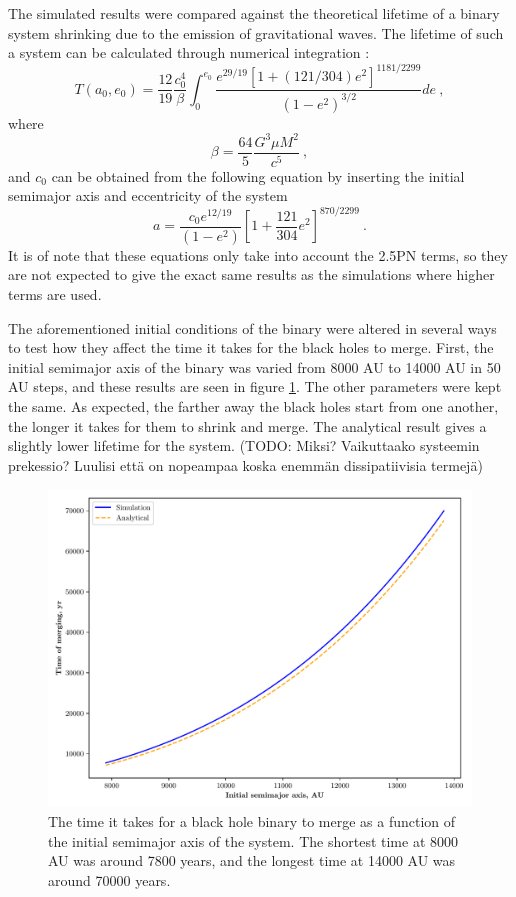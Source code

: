 \documentclass[english, oneside]{HYgradu}
\begin{document}
The simulated results were compared against the theoretical lifetime of a binary system shrinking due to the emission of gravitational waves. The lifetime of such a system can be calculated through numerical integration \citep{peters:1964}:
\begin{equation}
T(a_0, e_0) = \frac{12}{19} \frac{c_0^4}{\beta} \int_0^{e_0} \frac{e^{29/19} [1 + (121/304)e^2]^{1181/2299}}{(1-e^2)^{3/2}} de \ ,
\end{equation}
where 
\begin{equation}
\beta = \frac{64}{5} \frac{G^3 \mu M^2}{c^5} \ ,
\end{equation}
and $c_0$ can be obtained from the following equation by inserting the initial semimajor axis and eccentricity of the system
\begin{equation}
a = \frac{c_0 e^{12/19}}{(1-e^2)} \left[ 1 + \frac{121}{304} e^2 \right]^{870/2299} \ .
\end{equation}
It is of note that these equations only take into account the 2.5PN terms, so they are not expected to give the exact same results as the simulations where higher terms are used.

The aforementioned initial conditions of the binary were altered in several ways to test how they affect the time it takes for the black holes to merge. First, the initial semimajor axis of the binary was varied from 8000 AU to 14000 AU in 50 AU steps, and these results are seen in figure \ref{fig:bh-merge-semi}. The other parameters were kept the same. As expected, the farther away the black holes start from one another, the longer it takes for them to shrink and merge. The analytical result gives a slightly lower lifetime for the system. (TODO: Miksi? Vaikuttaako systeemin prekessio? Luulisi että on nopeampaa koska enemmän dissipatiivisia termejä)
\begin{figure}[h!tb]
\centering
\includegraphics[scale=0.6]{../images/bh-merge-semi.pdf}
\caption{The time it takes for a black hole binary to merge as a function of the initial semimajor axis of the system. The shortest time at 8000 AU was around 7800 years, and the longest time at 14000 AU was around 70000 years.}
\label{fig:bh-merge-semi}
\end{figure}
\end{document}
